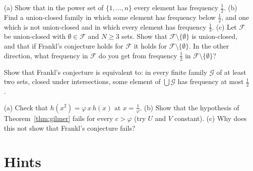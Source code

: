 \begin{exercise}[$\star$]\label{ex:ucsharp}
(a) Show that in the power set of $\{1,\dots,n\}$ every element has frequency $\frac12$. (b) Find a union-closed family in which some element has
frequency below $\frac12$, and one which is not union-closed and in which every element has frequency $\frac13$. (c) Let $\mathcal F$ be union-closed with
$\emptyset\in\mathcal F$ and $N\ge3$ sets. Show that $\mathcal F\setminus\{\emptyset\}$ is union-closed, and that if Frankl's conjecture holds for
$\mathcal F$ it holds for $\mathcal F\setminus\{\emptyset\}$. In the other direction, what frequency in $\mathcal F$ do you get from frequency
$\frac12$ in $\mathcal F\setminus\{\emptyset\}$?
\end{exercise}

\begin{exercise}[$\star$]\label{ex:ucdual}
Show that Frankl's conjecture is equivalent to: in every finite family $\mathcal G$ of at least two sets, closed under intersections, some element of
$\bigcup\mathcal G$ has frequency at most $\frac12$.
\end{exercise}

\begin{exercise}[$\star\star$]\label{ex:ucgolden}
(a) Check that $h(x^2)=\varphi\,x\,h(x)$ at $x=\frac1\varphi$. (b) Show that the hypothesis of Theorem~\ref{thm:gilmer} fails for every $c>\varphi$ (try
$U$ and $V$ constant). (c) Why does this not show that Frankl's conjecture fails?
\end{exercise}

\section{Hints}

